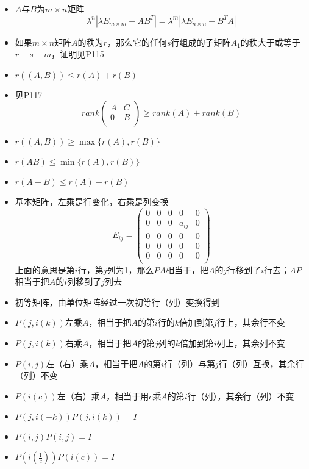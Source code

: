 \documentclass[UTF8]{ctexart}
\begin{document}
\begin{itemize}
\item $A$与$B$为$m\times n$矩阵
\[
\lambda^n |\lambda E_{m\times m} - AB^T| = \lambda^m|\lambda E_{n\times n} - B^{T}A|
\]

\item 如果$m\times n$矩阵$A$的秩为$r$，那么它的任何$s$行组成的子矩阵$A_1$的秩大于或等于$r+s-m$，证明见P115

\item $r((A,B)) \leq r(A)+r(B)$
\item 见P117
\[
rank\left(
\begin{array}{cc}
A & C\\
0 & B\\
\end{array}
\right) \geq rank(A) + rank(B)
\]

\item $r((A,B))\geq \max\{r(A),r(B)\}$
\item $r(AB)\leq \min\{r(A),r(B)\}$
\item $r(A+B)\leq r(A)+r(B)$

\item 基本矩阵，左乘是行变化，右乘是列变换
\[
E_{ij} = \left(
\begin{array}{ccccc}
0 & 0 & 0 & 0 & 0 \\
0 & 0 & 0 & a_{ij} & 0 \\
0 & 0 & 0 & 0 & 0 \\
0 & 0 & 0 & 0 & 0 \\
0 & 0 & 0 & 0 & 0 \\
\end{array}
\right)
\]
上面的意思是第$i$行，第$j$列为1，那么$PA$相当于，把$A$的$j$行移到了$i$行去；$AP$相当于把$A$的$i$列移到了$j$列去

\item 初等矩阵，由单位矩阵经过一次初等行（列）变换得到
\item $P(j,i(k))$左乘$A$，相当于把$A$的第$i$行的$k$倍加到第$j$行上，其余行不变

\item $P(j,i(k))$右乘$A$，相当于把$A$的第$j$列的$k$倍加到第$i$列上，其余列不变
\item $P(i,j)$左（右）乘$A$，相当于把$A$的第$i$行（列）与第$j$行（列）互换，其余行（列）不变
\item $P(i(c))$左（右）乘$A$，相当于用$c$乘$A$的第$i$行（列），其余行（列）不变
\item $P(j,i(-k))P(j,i(k)) = I$
\item $P(i,j)P(i,j) = I$
\item $P(i(\frac{1}{c}))P(i(c)) = I$



\end{itemize}
\end{document}
